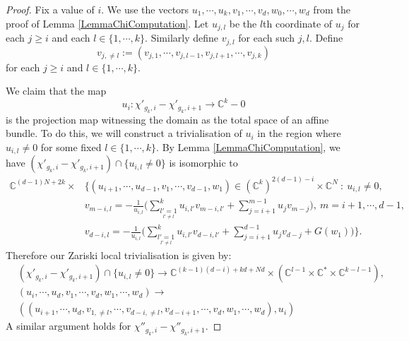\documentclass[10pt,a4paper]{amsart}
\newcommand{\C}{\mathbb C}
\newcommand{\bC}{\mathbb{C}}
\renewcommand{\geq}{\geqslant}
\begin{document}
\begin{proof}
	Fix a value of $i$. We use the vectors $u_1,\cdots,u_k,v_1,\cdots,v_d,w_0,\cdots,w_d$ from the proof of Lemma \ref{LemmaChiComputation}.
	Let $u_{j,l}$ be the $l$th coordinate of $u_j$ for each $j \geq i$ and each $l \in \{1,\cdots,k\}$.
	Similarly define $v_{j,l}$ for each such $j,l$.
	Define
	\begin{equation}
		v_{j,\neq l} := (v_{j,1},\cdots,v_{j,l-1},v_{j,l+1},\cdots,v_{j,k})
	\end{equation}
	for each $j \geq i$ and $l \in \{1,\cdots,k\}$.




	We claim that the map
	\begin{equation}
		u_i: \chi'_{g_k,i}-\chi'_{g_k,i+1} \to \C^k-0
	\end{equation}
	is the projection map witnessing the domain as the total space of an affine bundle.
	To do this, we will construct a trivialisation of $u_i$ in the region where $u_{i,l} \neq 0$ for some fixed $l \in \{1,\cdots,k\}$.
	By Lemma \ref{LemmaChiComputation}, we have $(\chi'_{g_k,i}-\chi'_{g_k,i+1}) \cap \{u_{i,l} \neq 0\}$ is isomorphic to
	\begin{equation} \label{eqnMainChiEqn2}
		\begin{aligned}
			\bC^{(d-1)N+2k} \times & \Big\{(u_{i+1},\cdots,u_{d-1},v_1,\cdots,v_{d-1},w_1)  \in (\bC^{k})^{2(d-1)-i} \times \bC^N \ : \
			u_{i,l} \neq 0,                                                                                                                                      \\ &
			v_{m-i,l} = -\frac{1}{u_{i,l}}\Big(\sum_{\underset{l' \neq l}{l'=1}}^k u_{i,l'}v_{m-i,l'} + \sum_{j=i+1}^{m-1} u_j v_{m-j}\Big), \ m=i+1,\cdots,d-1, \\ &
			v_{d-i,l} = -\frac{1}{u_{i,l}}\Big(\sum_{\underset{l' \neq l}{l'=1}}^k u_{i,l'}v_{d-i,l'} + \sum_{j=i+1}^{d-1} u_j v_{d-j}+G(w_1)\Big) \Big\}.
		\end{aligned}
	\end{equation}
	Therefore our Zariski local trivialisation is given by:
	\begin{equation}
		\begin{aligned}
			 & (\chi'_{g_k,i}-\chi'_{g_k,i+1}) \cap \{u_{i,l} \neq 0\} \to \bC^{(k-1)(d-i) + kd + Nd} \times (\bC^{l-1} \times \bC^* \times \bC^{k-l-1}),
			\\  & (u_i,\cdots,u_d,v_1,\cdots,v_d,w_1,\cdots,w_d) \to \\ &  ((u_{i+1},\cdots,u_d,v_{1,\neq l},\cdots,v_{d-i,\neq l},v_{d-i+1},\cdots,v_d,w_1,\cdots,w_d),u_i)
		\end{aligned}
	\end{equation}
	A similar argument holds for $\chi''_{g_k,i}-\chi''_{g_k,i+1}$.
\end{proof}
\end{document}
